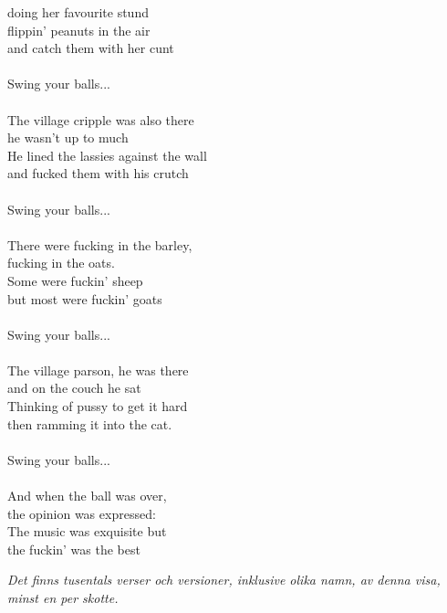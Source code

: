 doing her favourite stund\\
flippin' peanuts in the air\\
and catch them with her cunt\\
\\
Swing your balls...\\
\\
The village cripple was also there\\
he wasn't up to much\\
He lined the lassies against the wall\\
and fucked them with his crutch\\
\\
Swing your balls...\\
\\
There were fucking in the barley,\\
fucking in the oats.\\
Some were fuckin' sheep\\
but most were fuckin' goats\\
\\
Swing your balls...\\
\\
The village parson, he was there\\
and on the couch he sat\\
Thinking of pussy to get it hard\\
then ramming it into the cat.\\
\\
Swing your balls...\\
\\
And when the ball was over,\\
the opinion was expressed:\\
The music was exquisite but\\
the fuckin' was the best
\par
\vspace{10pt}
{\footnotesize\textit{Det finns tusentals verser och versioner, inklusive olika namn, av denna visa, minst en per skotte.}}

